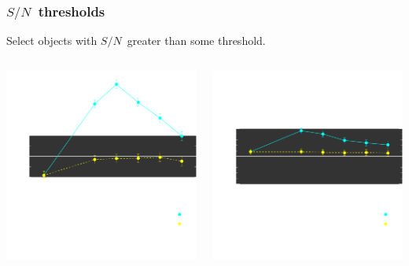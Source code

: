 \documentclass{beamer}
\newcommand{\snr}{$S/N$}
\begin{document}
\frame
{
    \frametitle{\snr\ thresholds}
 
    Select objects with \snr\ greater than some threshold.

    \begin{columns}
        \begin{column}{0.5\textwidth}    

            \begin{center}
                \includegraphics[width=\textwidth]{m-select-bias-thresh-inv.pdf}
                \newline
            \end{center}
        \end{column}
        \begin{column}{0.5\textwidth}
            \begin{center}
                \includegraphics[width=\textwidth]{c-select-bias-thresh-inv.pdf}

\end{center}
\end{column}
\end{columns}}
\end{document}
